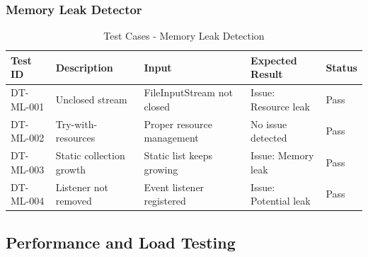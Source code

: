 \documentclass[12pt,a4paper]{article}
\begin{document}
    \subsubsection{Memory Leak Detector}

    \begin{table}[H]
        \caption{Test Cases - Memory Leak Detection}
        \begin{tabular}{|p{2cm}|p{4cm}|p{3cm}|p{3cm}|p{1.5cm}|}
            \hline
            \textbf{Test ID} & \textbf{Description} & \textbf{Input} & \textbf{Expected Result} & \textbf{Status} \\
            \hline
            DT-ML-001 & Unclosed stream & FileInputStream not closed & Issue: Resource leak & Pass \\
            \hline
            DT-ML-002 & Try-with-resources & Proper resource management & No issue detected & Pass \\
            \hline
            DT-ML-003 & Static collection growth & Static list keeps growing & Issue: Memory leak & Pass \\
            \hline
            DT-ML-004 & Listener not removed & Event listener registered & Issue: Potential leak & Pass \\
            \hline
        \end{tabular}
    \end{table}

    \subsection{Performance and Load Testing}
\end{document}

